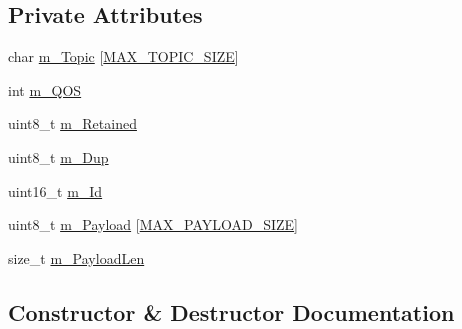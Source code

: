 \subsection*{Private Attributes}
\begin{DoxyCompactItemize}
\item 
char \hyperlink{classIoTT_1_1mqttMessageQueueItem_ae7a0f10a754905c9ada9503faf15dd08}{m\+\_\+\+Topic} \mbox{[}\hyperlink{mqttMessageQueueItem_8h_a1b819cebb31ed04780e6b51f061d06dd}{M\+A\+X\+\_\+\+T\+O\+P\+I\+C\+\_\+\+S\+I\+ZE}\mbox{]}
\item 
int \hyperlink{classIoTT_1_1mqttMessageQueueItem_afb357b1a0e8a4d6a96b7e6a252adacbf}{m\+\_\+\+Q\+OS}
\item 
uint8\+\_\+t \hyperlink{classIoTT_1_1mqttMessageQueueItem_a4aa9a491040a3d3399defd35ced86b34}{m\+\_\+\+Retained}
\item 
uint8\+\_\+t \hyperlink{classIoTT_1_1mqttMessageQueueItem_a71acf8334dd0f67f4855b735eadf6b33}{m\+\_\+\+Dup}
\item 
uint16\+\_\+t \hyperlink{classIoTT_1_1mqttMessageQueueItem_aa454dfde75fb541b9f30aa66f08e34ee}{m\+\_\+\+Id}
\item 
uint8\+\_\+t \hyperlink{classIoTT_1_1mqttMessageQueueItem_a183e210ead7338a531a77c4fae946700}{m\+\_\+\+Payload} \mbox{[}\hyperlink{mqttMessageQueueItem_8h_a6303f7392a2d06be5a121c54278d561b}{M\+A\+X\+\_\+\+P\+A\+Y\+L\+O\+A\+D\+\_\+\+S\+I\+ZE}\mbox{]}
\item 
size\+\_\+t \hyperlink{classIoTT_1_1mqttMessageQueueItem_a307dbaadc852f447534d3f1916311ddf}{m\+\_\+\+Payload\+Len}
\end{DoxyCompactItemize}


\subsection{Constructor \& Destructor Documentation}
\mbox{\label{classIoTT_1_1mqttMessageQueueItem_a48f9b083e9734d17b727571f94f32d5d}} 
